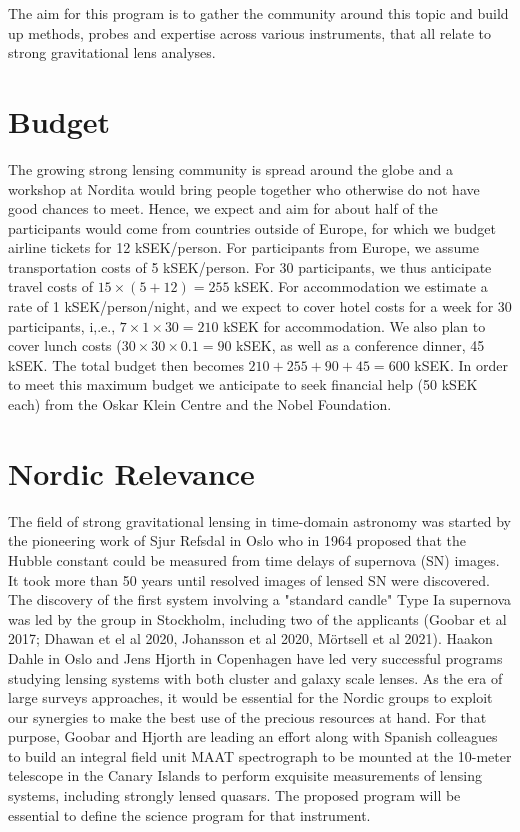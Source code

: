 \documentclass[11pt, letterpaper]{article}
\newcommand{\notesRemy}[1]{\textcolor{purple}{\bf \\  Remy: #1}}
\begin{document}
    The aim for this program is to gather the community around this topic and build up methods, probes and expertise across various instruments,  that all relate to strong gravitational lens analyses. 
    
\section{Budget}
The growing strong lensing community is spread around the globe and a workshop at Nordita would bring people together who otherwise do not have good chances to meet. Hence, we expect and aim for about half of the participants would come from countries outside of Europe, for which we budget airline tickets for 12 kSEK/person. For participants from Europe, we assume transportation costs of 5 kSEK/person. For 30 participants, we thus anticipate travel costs of $ 15 \times (5 + 12) = 255$ kSEK.
For accommodation we estimate a rate of 1 kSEK/person/night, and we expect to cover hotel costs for a week for 30 participants, i,.e., $7 \times 1 \times 30 = 210$ kSEK for accommodation. We also plan to cover lunch costs ($30 \times 30 \times 0.1 = 90$ kSEK, as well as a conference dinner, 45 kSEK.
The total budget then becomes $210 + 255 + 90 + 45 = 600$ kSEK. In order to meet this maximum budget we anticipate to seek financial help (50 kSEK each) from the Oskar Klein Centre and the Nobel Foundation.

\section{Nordic Relevance}
The field of strong gravitational lensing in time-domain astronomy was started by 
the pioneering work of Sjur Refsdal in Oslo who in 1964 proposed that the Hubble constant could be measured from time delays of supernova (SN) images. It took more than 50 years until resolved images of lensed SN were discovered. The discovery of the first system involving a "standard candle" Type Ia supernova was led by the group in Stockholm, including two of the applicants (Goobar et al 2017; Dhawan et el al 2020, Johansson et al 2020, M\"ortsell et al 2021). Haakon Dahle in Oslo and Jens Hjorth in Copenhagen have led very successful programs studying lensing systems with both cluster and galaxy scale lenses. As the era of large surveys approaches, it would be essential for the Nordic groups to exploit our synergies to make the best use of the precious resources at hand. For that purpose, Goobar and Hjorth are leading an effort along with Spanish colleagues to build an integral field unit MAAT spectrograph to be mounted at the 10-meter telescope in the Canary Islands to perform exquisite measurements of lensing systems, including strongly lensed quasars. The proposed program will be essential to define the science program for that instrument.         
\end{document}
